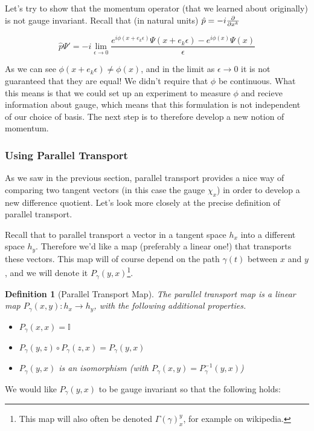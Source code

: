 \documentclass{article}
\newtheorem{defn}{Definition}
\begin{document}
Let's try to show that the momentum operator (that we learned about originally) is not gauge invariant. Recall that (in natural units) $\hat p = -i \pdv{x^k}$

\[\hat p \Psi' = -i \lim_{\epsilon \to 0}\frac{e^{i\phi(x+e_k\epsilon)}\Psi(x+e_k\epsilon) - e^{i\phi(x)}\Psi(x)}{\epsilon}\]

As we can see $\phi(x+e_k \epsilon) \neq \phi(x)$, and in the limit as $\epsilon \to 0$ it is not guaranteed that they are equal! We didn't require that $\phi$ be continuous. What this means is that we could set up an experiment to measure $\phi$ and recieve information about gauge, which means that this formulation is not independent of our choice of basis. The next step is to therefore develop a new notion of momentum.

\subsubsection{Using Parallel Transport}

As we saw in the previous section, parallel transport provides a nice way of comparing two tangent vectors (in this case the gauge $\chi_x$) in order to develop a new difference quotient. Let's look more closely at the precise definition of parallel transport. 

Recall that to parallel transport a vector in a tangent space $h_x$ into a different space $h_y$. Therefore we'd like a map (preferably a linear one!) that transports these vectors. This map will of course depend on the path $\gamma(t)$ between $x$ and $y$, and we will denote it $P_\gamma(y,x)$\footnote{This map will also often be denoted $\Gamma(\gamma)_x^y$, for example on wikipedia.}.

\begin{defn}[Parallel Transport Map] The parallel transport map is a linear map $P_\gamma(x,y) : h_x \to h_y$, with the following additional properties.
\begin{itemize}\setlength\itemsep{0.5em}
\item$ P_\gamma(x,x) = \mathbb{I}$
\item$ P_\gamma(y,z) \circ P_\gamma(z,x) = P_\gamma(y,x)$
\item$ P_\gamma(y,x)$ is an isomorphism (with $P_\gamma(x,y)=P^{-1}_\gamma(y,x)$)
\end{itemize}
\end{defn}
 
We would like $P_\gamma(y,x)$ to be gauge invariant so that the following holds:
\end{document}
